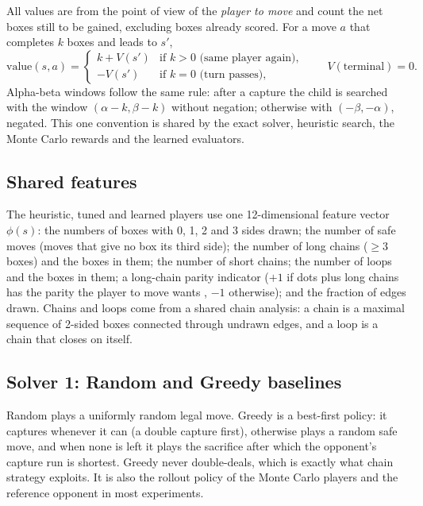 \documentclass[11pt,a4paper]{article}
\begin{document}
All values are from the point of view of the \emph{player to move} and count the net
boxes still to be gained, excluding boxes already scored. For a move $a$ that completes
$k$ boxes and leads to $s'$,
\begin{equation}
  \mathrm{value}(s,a) =
  \begin{cases}
    k + V(s') & \text{if } k>0 \text{ (same player again)},\\
    -V(s')    & \text{if } k=0 \text{ (turn passes)},
  \end{cases}
  \qquad V(\text{terminal}) = 0 .
  \label{eq:value}
\end{equation}
Alpha-beta windows follow the same rule: after a capture the child is searched with the
window $(\alpha-k,\beta-k)$ without negation; otherwise with $(-\beta,-\alpha)$, negated.
This one convention is shared by the exact solver, heuristic search, the Monte Carlo
rewards and the learned evaluators.

\subsection{Shared features}

The heuristic, tuned and learned players use one 12-dimensional feature vector
$\phi(s)$: the numbers of boxes with 0, 1, 2 and 3 sides drawn; the number of safe moves
(moves that give no box its third side); the number of long chains ($\geq 3$ boxes) and
the boxes in them; the number of short chains; the number of loops and the boxes in
them; a long-chain parity indicator ($+1$ if dots plus long chains has the parity the
player to move wants \cite{berlekamp2000dots}, $-1$ otherwise); and the fraction of edges
drawn. Chains and loops come from a shared chain analysis: a chain is a maximal sequence
of 2-sided boxes connected through undrawn edges, and a loop is a chain that closes on
itself.

\subsection{Solver 1: Random and Greedy baselines}

Random plays a uniformly random legal move. Greedy is a best-first policy: it captures
whenever it can (a double capture first), otherwise plays a random safe move, and when
none is left it plays the sacrifice after which the opponent's capture run is shortest.
Greedy never double-deals, which is exactly what chain strategy exploits. It is also the
rollout policy of the Monte Carlo players and the reference opponent in most experiments.
\end{document}
